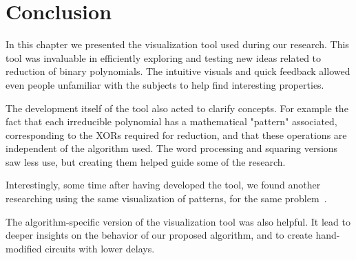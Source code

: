 \section{Conclusion} \label{section:visual:conclusion}

In this chapter we presented the visualization tool used during our research. This tool was invaluable in efficiently exploring and testing new ideas related to reduction of binary polynomials. The intuitive visuals and quick feedback allowed even people unfamiliar with the subjects to help find interesting properties.

The development itself of the tool also acted to clarify concepts. For example the fact that each irreducible polynomial has a mathematical "pattern" associated, corresponding to the XORs required for reduction, and that these operations are independent of the algorithm used. The word processing and squaring versions saw less use, but creating them helped guide some of the research.

Interestingly, some time after having developed the tool, we found another researching using the same visualization of patterns, for the same problem~\cite{paper_com_imagens_dos_padroes}.

The algorithm-specific version of the visualization tool was also helpful. It lead to deeper insights on the behavior of our proposed algorithm, and to create hand-modified circuits with lower delays.